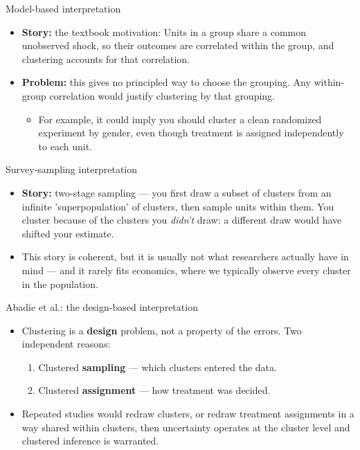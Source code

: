 \documentclass[11pt,aspectratio=169]{beamer}
\newcommand{\bx}[1]{\textbf{#1}}
\begin{document}
\begin{frame}{Model-based interpretation}
\begin{itemize}\setlength{\itemsep}{9pt}
  \item \bx{Story:} the textbook motivation: Units in a group share a common unobserved shock, so their
        outcomes are correlated within the group, and clustering accounts for that correlation.
  \item \bx{Problem:} this gives no principled way to choose the grouping. Any within-group correlation would
        justify clustering by that grouping.
    \begin{itemize}\setlength{\itemsep}{3pt}
      \item For example, it could imply you should cluster a clean randomized experiment by gender, even though treatment is assigned independently to each unit.
    \end{itemize}
\end{itemize}
\end{frame}

\begin{frame}{Survey-sampling interpretation}
\begin{itemize}\setlength{\itemsep}{9pt}
  \item \bx{Story:} two-stage sampling --- you first draw a subset of clusters from an infinite 'superpopulation' of
        clusters, then sample units within them. You cluster because of the clusters you \emph{didn't} draw: a
        different draw would have shifted your estimate.
  \item This story is coherent, but it is usually not what researchers actually have in mind --- and it
        rarely fits economics, where we typically observe every cluster in the population.
\end{itemize}
\end{frame}

\begin{frame}{Abadie et al.: the design-based interpretation}
\begin{itemize}\setlength{\itemsep}{11pt}
  \item Clustering is a \bx{design} problem, not a property of the errors. Two independent reasons:
    \begin{enumerate}\setlength{\itemsep}{3pt}
      \item Clustered \bx{sampling} --- which clusters entered the data.
      \item Clustered \bx{assignment} --- how treatment was decided.
    \end{enumerate}
  \item Repeated studies would redraw clusters, or redraw treatment assignments in a way shared within clusters, then uncertainty operates at the cluster level and clustered inference is warranted.
\end{itemize}
\end{frame}
\end{document}

